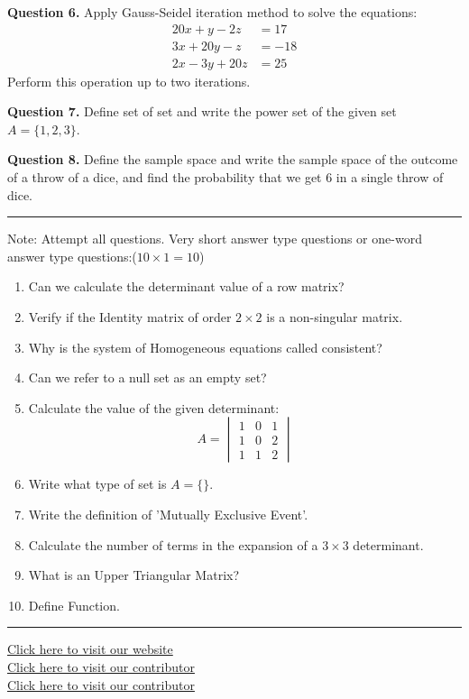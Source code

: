 \documentclass[11pt,a4paper]{article}
\begin{document}
\medskip


\noindent   \textbf{Question 6.} Apply Gauss-Seidel iteration method to solve the equations:
\[

\begin{aligned}
  20x + y - 2z &= 17 \\
  3x + 20y - z &= -18 \\
  2x - 3y + 20z &= 25
\end{aligned}
\]
Perform this operation up to two iterations.

\medskip


\noindent   \textbf{Question 7.} Define set of set and write the power set of the given set $A = \{1, 2, 3\}$.

\medskip


\noindent   \textbf{Question 8.} Define the sample space and write the sample space of the outcome of a throw of a dice, and find the probability that we get 6 in a single throw of dice.

\bigskip


\rule{\linewidth}{0.4pt}\smallskip

Note: Attempt all questions. Very short answer type questions or one-word answer type questions:\hfill ($10  \times 1 = 10$)


\begin{enumerate}[label=\arabic*.,leftmargin=*,itemsep=6pt]
  \item Can we calculate the determinant value of a row matrix?
  \item Verify if the Identity matrix of order $2  \times 2$ is a non-singular matrix.
  \item Why is the system of Homogeneous equations called consistent?
  \item Can we refer to a null set as an empty set?
  \item Calculate the value of the given determinant:
  \[
  A = 
\begin{vmatrix}
    1 & 0 & 1 \\
    1 & 0 & 2 \\
    1 & 1 & 2
  \end{vmatrix}
  \]
  \item Write what type of set is $A = \{\}$.
  \item Write the definition of 'Mutually Exclusive Event'.
  \item Calculate the number of terms in the expansion of a $3  \times 3$ determinant.
  \item What is an Upper Triangular Matrix?
  \item Define Function.
\end{enumerate}

\vfill
\rule{\linewidth}{0.4pt}

\begin{center}\small
\href{https://bhu-exam.vercel.app/}{Click here to visit our website}\\[4pt]\href{https://me-aryan.vercel.app/}{Click here to visit our contributor}\\[4pt]\href{https://quashan-me.vercel.app/}{Click here to visit our contributor}
\end{center}
\end{document}
